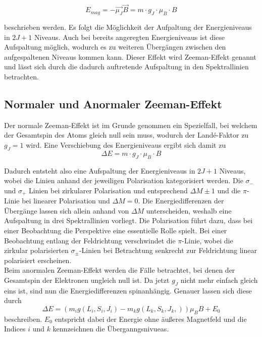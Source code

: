 \begin{equation}
    E_{mag} =  -\vec{\mu_J} \vec{B} = m\cdot g_J\cdot \mu_B\cdot B
\end{equation}

beschrieben werden. Es folgt die Möglichkeit der Aufpaltung der Energieniveaus in $2J+1$ Niveaus.
Auch bei bereits angeregten Energieniveaus ist diese Aufspaltung möglich, wodurch es zu weiteren Übergängen zwischen den aufgespaltenen Niveaus 
kommen kann. Dieser Effekt wird Zeeman-Effekt genannt und lässt sich durch die dadurch auftretende Aufspaltung in den Spektrallinien betrachten.

\subsection{Normaler und Anormaler Zeeman-Effekt}

Der normale Zeeman-Effekt ist im Grunde genommen ein Spezielfall, bei welchem der Gesamtspin des Atoms gleich null sein muss, wodurch der 
Landé-Faktor zu $g_J = 1$ wird. Eine Verschiebung des Energieniveaus ergibt sich damit zu 
\begin{equation}
    \Delta E = m\cdot g_J\cdot \mu_B\cdot B
\end{equation}

Dadurch entsteht also eine Aufspaltung der Energieniveaus in $2J+1$ Niveaus, wobei die Linien anhand der jeweiligen Polarisation kategorisiert
werden. Die $\sigma_-$ und $\sigma_+$ Linien bei zirkularer Polarisation und entsprechend $\Delta M \pm 1$ und die $\pi$-Linie bei linearer 
Polarisation und $\Delta M =0$. Die Energiedifferenzen der Übergänge lassen sich allein anhand von $\Delta M$ unterscheiden, weshalb eine 
Aufspaltung in drei Spektrallinien vorliegt. Die Polarisation führt dazu, dass bei einer Beobachtung die Perspektive eine essentielle Rolle spielt.
Bei einer Beobachtung entlang der Feldrichtung verschwindet die $\pi$-Linie, wobei die zirkular polarisierten $\sigma_{\pm}$-Linien bei 
Betrachtung senkrecht zur Feldrichtung linear polarisiert erscheinen. 
\\
Beim anormalen Zeeman-Effekt werden die Fälle betrachtet, bei denen der Gesamtspin der Elektronen ungleich null ist. Da jetzt $g_J$ nicht mehr 
einfach gleich eins ist, sind nun die Energiedifferenzen spinanhängig. Genauer lassen sich diese durch 
\begin{equation}
    \Delta E = (m_i g(L_i,S_i,J_i) -m_k g(L_k,S_k,J_k,))\mu_B B + E_0
\end{equation}
beschreiben. $E_0$ entspricht dabei der Energie ohne äußeres Magnetfeld und die Indices $i$ und $k$ kennzeichnen die Überganngsnivueas. 

